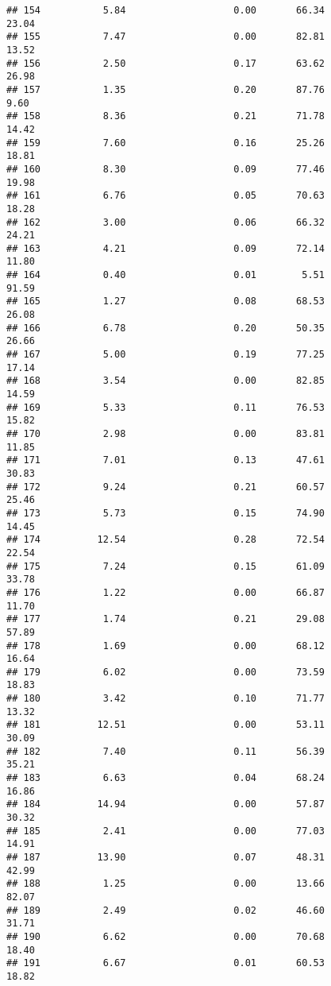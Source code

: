 \documentclass[
]{article}
\begin{document}
\begin{verbatim}
## 154           5.84                   0.00       66.34          23.04
## 155           7.47                   0.00       82.81          13.52
## 156           2.50                   0.17       63.62          26.98
## 157           1.35                   0.20       87.76           9.60
## 158           8.36                   0.21       71.78          14.42
## 159           7.60                   0.16       25.26          18.81
## 160           8.30                   0.09       77.46          19.98
## 161           6.76                   0.05       70.63          18.28
## 162           3.00                   0.06       66.32          24.21
## 163           4.21                   0.09       72.14          11.80
## 164           0.40                   0.01        5.51          91.59
## 165           1.27                   0.08       68.53          26.08
## 166           6.78                   0.20       50.35          26.66
## 167           5.00                   0.19       77.25          17.14
## 168           3.54                   0.00       82.85          14.59
## 169           5.33                   0.11       76.53          15.82
## 170           2.98                   0.00       83.81          11.85
## 171           7.01                   0.13       47.61          30.83
## 172           9.24                   0.21       60.57          25.46
## 173           5.73                   0.15       74.90          14.45
## 174          12.54                   0.28       72.54          22.54
## 175           7.24                   0.15       61.09          33.78
## 176           1.22                   0.00       66.87          11.70
## 177           1.74                   0.21       29.08          57.89
## 178           1.69                   0.00       68.12          16.64
## 179           6.02                   0.00       73.59          18.83
## 180           3.42                   0.10       71.77          13.32
## 181          12.51                   0.00       53.11          30.09
## 182           7.40                   0.11       56.39          35.21
## 183           6.63                   0.04       68.24          16.86
## 184          14.94                   0.00       57.87          30.32
## 185           2.41                   0.00       77.03          14.91
## 187          13.90                   0.07       48.31          42.99
## 188           1.25                   0.00       13.66          82.07
## 189           2.49                   0.02       46.60          31.71
## 190           6.62                   0.00       70.68          18.40
## 191           6.67                   0.01       60.53          18.82

\end{verbatim}
\end{document}
